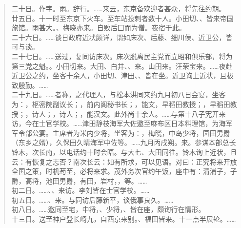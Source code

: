 \begin{quote}
二十日。作字。雨。辞行。……来云，东京备欢迎者甚众，将先往约期。\\

廿五日。十一时至东京下火车。至车站投刺者数十人。小田切、、皆来帝国旅馆。雨甚大。、梅晓亦来。自败后囗而为僧。夜宿于此。\\

二十六日。……谈日政府近状颇详，谓如床次、后藤、细川侯、近卫公，皆可与谈。\\

二十七日。……送过，复同访床次。床次脱离民主党而立昭和俱乐部，将为第三党之魁。。小田切来。大田、白井、、来。山田来。汪荣宝来。……夜赴近卫公之约，坐客十余人，小田切、津田、、皆在坐。近卫询上近状，且极致殷勤。……\\

二十九日。……者称，之代理人，与松本洪同来约九月初八日会宴，坐客为：，枢密院副议长；，前内阁秘书长；，能文，早稻田教授；，早稻田教授；，诗人；，诗人；，能汉文。此外尚十余人。……与第十八子宪开来访，今在士官学校。……津田静枝海军大佐邀至麻布区日本料理馆，为海军军令部公宴。主席者为米内少将，坐客为：，梅晓，中岛少将，园田男爵（东乡之婿），久保田久晴海军中佐等。……九月丙戌朔。来。参谋本部总长铃木，次长南，以电话约十时会晤。与大七、大田同往。铃木询上近状，且云：有恢复之志否？南次长云：如有所求，可以见语。对曰：正究将来开放全国之策，时机苟至，必将来求。茂外务次官约午饭，座中有：清浦子，子爵，高将，池田男爵，有田，岩村，，等。……\\

初二日。……、、来访。李刘皆在士官学校。……\\

初五日。……、来。与同访后藤新平，谈俄事良久。……\\

初八日。……邀同至宅，中将，、少将，、皆在座，颇询行在情形。\\

十三日。送至神户登长崎九，自西京来别。、福田皆来。十一点半展轮。……\\
\end{quote}

